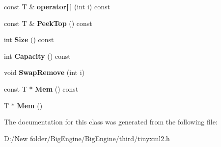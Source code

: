 \begin{DoxyCompactItemize}
const T \& {\bfseries operator\mbox{[}$\,$\mbox{]}} (int i) const
\item 
\mbox{\label{classtinyxml2_1_1_dyn_array_a5e4e1e408e646688503dec77c77c9d59}} 
const T \& {\bfseries Peek\+Top} () const
\item 
\mbox{\label{classtinyxml2_1_1_dyn_array_a67614d80847eb92cab330f1a5849a9a2}} 
int {\bfseries Size} () const
\item 
\mbox{\label{classtinyxml2_1_1_dyn_array_a8e101fdf5b4248ac119d7dca6d0f5421}} 
int {\bfseries Capacity} () const
\item 
\mbox{\label{classtinyxml2_1_1_dyn_array_aa72c644f8b5e9ec5dab5b66c88f5665f}} 
void {\bfseries Swap\+Remove} (int i)
\item 
\mbox{\label{classtinyxml2_1_1_dyn_array_a60b33e61cf10b3fd900ee46692dc0fe9}} 
const T $\ast$ {\bfseries Mem} () const
\item 
\mbox{\label{classtinyxml2_1_1_dyn_array_a2f0842cd666e2ad951f1a8bd6561fa40}} 
T $\ast$ {\bfseries Mem} ()
\end{DoxyCompactItemize}


The documentation for this class was generated from the following file\+:\begin{DoxyCompactItemize}
\item 
D\+:/\+New folder/\+Big\+Engine/\+Big\+Engine/third/tinyxml2.\+h\end{DoxyCompactItemize}
